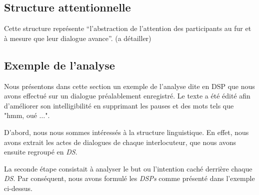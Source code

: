 	
		\subsection{Structure attentionnelle}
		
			Cette structure représente “l'abstraction de l'attention des participants au fur et à mesure que leur dialogue avance”. (a détailler)
		 
		 \subsection{Exemple de l'analyse}
			 Nous présentons dans cette section un exemple de l'analyse dite en DSP que nous avons effectué sur un dialogue préalablement enregistré. Le texte a été édité afin d'améliorer son intelligibilité en supprimant les pauses et des mots tels que "hmm, oué $\ldots$".
			 
			 D'abord, nous nous sommes intéressés à la structure linguistique. En effet, nous avons extrait les actes de dialogues de chaque interlocuteur, que nous avons ensuite regroupé en \emph{DS}. 
			 
			 La seconde étape consistait à analyser le but ou l'intention caché derrière chaque \emph{DS}. Par conséquent, nous avons formulé les \emph{DSPs} comme présenté dans l'exemple ci-dessus.		%
			
